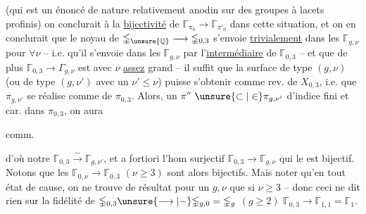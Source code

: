(qui est un énoncé de nature relativement anodin sur des groupes à lacets profinis) on conclurait à la \uline{bijectivité} de $\mathbb{\Gamma}_{\pi_0}\longrightarrow\mathbb{\Gamma}_{\pi'_0}$ dans cette situation, et on en conclurait que le noyau de $\mathbb{\Gamma}_{\unsure{\mathbb Q}}\longrightarrow\mathbb{\Gamma}_{0,3}$  s'envoie \uline{trivialement} dans les $\mathbb{\Gamma}_{g,\nu}$ pour $\forall\nu$ -- i.e. qu'il s'envoie dans les $\mathbb{\Gamma}_{g,\nu}$ par l'\uline{intermédiaire} de $\mathbb{\Gamma}_{0,3}$  -- et que de plus $\mathbb{\Gamma}_{0,3}\longrightarrow\Gamma_{g,\nu}$ est
 avec $\nu$ \uline{assez} grand -- il suffit que la surface de type $(g,\nu)$  (ou de type $(g,\nu')$ avec un $\nu'\leq\nu$) puisse s'obtenir comme rev.  de $X_{0,3}$, i.e. que $\pi_{g,\nu'}$ se réalise  comme     de $\pi_{0,3}$. Alors,   un $\pi''$  $\unsure{\subset|\in}\pi_{g,\nu'}$ d'indice fini et car. dans $\pi_{0,3}$, on aura

 comm.

d'où notre  $\mathbb{\Gamma}_{0,3}\xrightarrow{\sim}\mathbb{\Gamma}_{g,\nu'}$, et a fortiori l'hom surjectif $\mathbb{\Gamma}_{0,3}\longrightarrow\mathbb{\Gamma}_{g,\nu}$ qui le   est bijectif. Notons  que les $\mathbb{\Gamma}_{0,\nu}\longrightarrow\mathbb{\Gamma}_{0,3}$ $(\nu\geq3)$ sont alors bijectifs. Mais  noter qu'en tout état de cause, on ne trouve de résultat pour un $g,\nu$ que si $\nu\geq3$ -- donc ceci ne dit rien sur la fidélité   de $\mathbb{\Gamma}_{0,3}\unsure{\longrightarrow|-}\mathbb{\Gamma}_{g,0}=\mathbb{\Gamma}_g$ $(g\geq2)$  $\mathbb{\Gamma}_{0,3}\longrightarrow\mathbb{\Gamma}_{1,1}=\mathbb{\Gamma}_1$.

